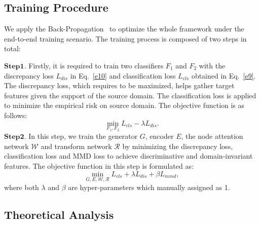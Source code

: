\documentclass{article}
\begin{document}
\subsection{Training Procedure}

We apply the Back-Propagation~\cite{rumelhart1986learning} to optimize the whole framework under the end-to-end training scenario. The training process is composed of two steps in total:


$\mathbf{Step 1}.$ Firstly, it is required to train two classifiers $F_1$ and $F_2$ with the discrepancy loss $L_{dis}$ in Eq.~\eqref{e10} and classification loss $L_{cls}$ obtained in Eq.~\eqref{e9}. The discrepancy loss, which requires to be maximized, helps gather target features given the support of the source domain. The classification loss is applied to minimize the empirical risk on source domain. The objective function is as follows:
\begin{equation}\label{e11}
  \mathop {\min} \limits_{ F_1, F_2}  L_{cls}  - \lambda L_{dis} .  
\end{equation}
$\mathbf{Step 2}.$ In this step, we train the generator $G$, encoder $E$, the node attention network $\mathcal{W}$ and transform network $\mathcal{R}$ by minimizing the discrepancy loss, classification loss and MMD loss to achieve discriminative and domain-invariant features. The objective function in this step is formulated as:
\begin{equation}\label{e12}
  \mathop {\min} \limits_{G,E, \mathcal{W},\mathcal{R}} L_{cls}  + \lambda L_{dis} + \beta L_{mmd},  
\end{equation}
where both $\lambda$ and $\beta$ are hyper-parameters which manually assigned as 1.



\subsection{Theoretical Analysis}
\end{document}
